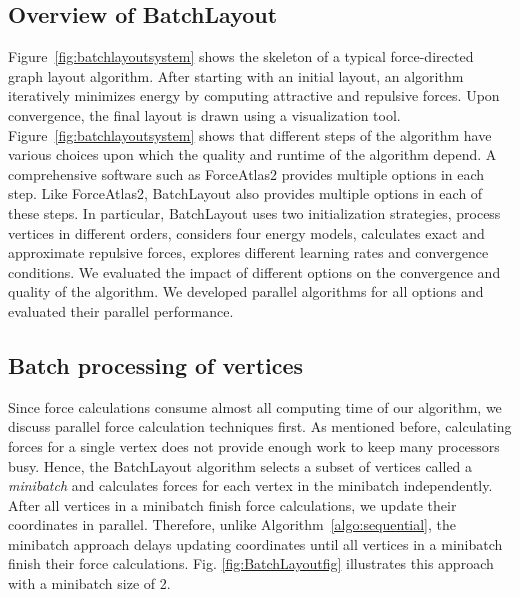 \documentclass{vgtc}
\newcommand{\toolname}{{BatchLayout}}
\begin{document}
\subsection{Overview of \toolname}
Figure~\ref{fig:batchlayoutsystem} shows the skeleton of a typical force-directed graph layout algorithm. 
After starting with an initial layout, an algorithm iteratively minimizes energy by computing attractive and repulsive forces.
Upon convergence, the final layout is drawn using a visualization tool. 
Figure~\ref{fig:batchlayoutsystem} shows that different steps of the algorithm have various choices upon which the quality and runtime of the algorithm depend. 
A comprehensive software such as ForceAtlas2 provides multiple options in each step. 
Like ForceAtlas2, \toolname{} also provides multiple options in each of these steps.
In particular, \toolname{} uses two initialization strategies, process vertices in different orders, considers four energy models, calculates exact and approximate repulsive forces, explores different learning rates and convergence conditions.
We evaluated the impact of different options on the convergence and quality of the algorithm.
We developed parallel algorithms for all options and evaluated their parallel performance. 


\subsection{Batch processing of vertices}
Since force calculations consume almost all computing time of our algorithm, we discuss parallel force calculation techniques first. 
As mentioned before, calculating forces for a single vertex does not provide enough work to keep many processors busy.
Hence, the \toolname{} algorithm selects a subset of vertices called a \emph{minibatch} and calculates forces for each vertex in the minibatch independently.
After all vertices in a minibatch finish force calculations, we update their coordinates in parallel.
Therefore, unlike Algorithm~\ref{algo:sequential}, the minibatch approach delays updating coordinates until all vertices in a minibatch finish their force calculations.
Fig. \ref{fig:BatchLayoutfig} illustrates this approach with a minibatch size of 2.
\end{document}
